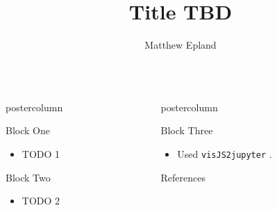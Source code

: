 \documentclass{beamer}
\title{\Huge Title TBD}
\author{Matthew Epland}
\institute[Duke]{Duke University}
\newcommand{\includedir}{../latex_files}
\newlength{\columnheight}
\begin{document}
\begin{frame}
\vspace{2.5cm} %
\begin{columns}
\begin{column}{.57\textwidth}
\begin{beamercolorbox}[center]{postercolumn}
\begin{minipage}{.98\textwidth}  %
\parbox[t][\columnheight]{\textwidth}{ %

  \begin{myblock}{Block One}
    \begin{itemize}
      \item TODO 1
    \end{itemize}
  \end{myblock}\vfill

  \begin{myblock}{Block Two}
    \begin{itemize}
      \item TODO 2
    \end{itemize}


  \end{myblock}\vfill

}\end{minipage}\end{beamercolorbox}
\end{column}

\begin{column}{.43\textwidth}
\begin{beamercolorbox}[center]{postercolumn}
\begin{minipage}{.98\textwidth}
\parbox[t][\columnheight]{\textwidth}{

  \begin{myblock}{Block Three}
    \begin{itemize}
      \item Used \texttt{visJS2jupyter} \cite{visJS2jupyter}.
    \end{itemize}
  \end{myblock}\vfill

  \begin{myblock}{References}
    
    {\footnotesize
      
    }
  \end{myblock}\vfill

}\end{minipage}\end{beamercolorbox}
\end{column}

\end{columns}
\end{frame}
\end{document}
